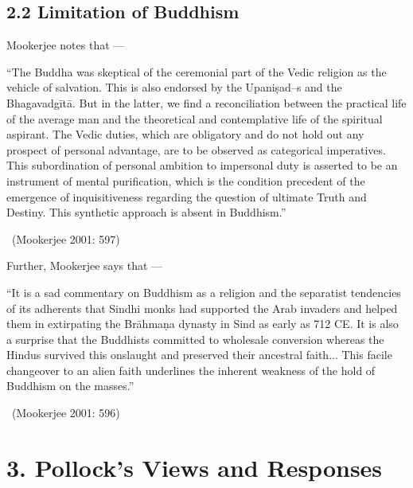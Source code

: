 \newpage

\subsection*{2.2 Limitation of Buddhism}

Mookerjee notes that —

\begin{myquote}
“The Buddha was skeptical of the ceremonial part of the Vedic religion as the vehicle of salvation. This is also endorsed by the Upaniṣad--s and the Bhagavadgītā. But in the latter, we find a reconciliation between the practical life of the average man and the theoretical and contemplative life of the spiritual aspirant. The Vedic duties, which are obligatory and do not hold out any prospect of personal advantage, are to be observed as categorical imperatives. This subordination of personal ambition to impersonal duty is asserted to be an instrument of mental purification, which is the condition precedent of the emergence of inquisitiveness regarding the question of ultimate Truth and Destiny. This synthetic approach is absent in Buddhism.” 

~\hfill (Mookerjee 2001: 597)
\end{myquote}

Further, Mookerjee says that —

\begin{myquote}
“It is a sad commentary on Buddhism as a religion and the separatist tendencies of its adherents that Sindhi monks had supported the Arab invaders and helped them in extirpating the Brāhmaṇa dynasty in Sind as early as 712 CE. It is also a surprise that the Buddhists committed to wholesale conversion whereas the Hindus survived this onslaught and preserved their ancestral faith... This facile changeover to an alien faith underlines the inherent weakness of the hold of Buddhism on the masses.” 

~\hfill (Mookerjee 2001: 596)
\end{myquote}



\section*{3. Pollock’s Views and Responses}

